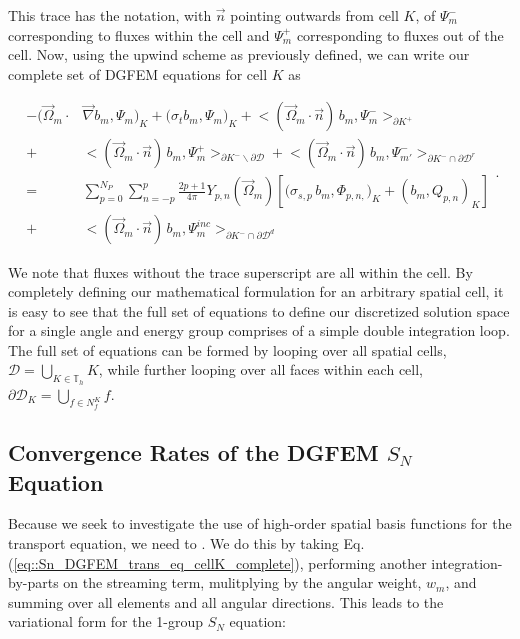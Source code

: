 \noindent This trace has the notation, with $\vec{n}$ pointing outwards from cell $K$, of $\Psi_m^-$ corresponding to fluxes within the cell and $\Psi_m^+$ corresponding to fluxes out of the cell. Now, using the upwind scheme as previously defined, we can write our complete set of DGFEM equations for cell $K$ as

\begin{equation}
\label{eq::Sn_DGFEM_trans_eq_cellK_complete}
\begin{aligned}
-  \Big( \vec{\Omega}_m \cdot  & \vec{\nabla} b_m, \Psi_{m} \Big)_{K}   + \Big(  \sigma_{t} b_m ,   \Psi_{m} \Big)_{K} +  \Big< ( \vec{\Omega}_m \cdot \vec{n} ) \, b_m, {\Psi}_m^{-}  \Big>_{\partial K^+}  \\
  + & \Big< ( \vec{\Omega}_m \cdot \vec{n} ) \, b_m, {\Psi}_m^{+}  \Big>_{\partial K^- \backslash \partial \mathcal{D}}  + \Big< ( \vec{\Omega}_m \cdot \vec{n} ) \, b_m, {\Psi}^{-}_{m'}  \Big>_{\partial K^- \cap \partial \mathcal{D}^r}  \\
= & \sum_{p=0}^{N_P} \sum_{n=-p}^{p} \frac{2p + 1}{4 \pi}  Y_{p,n} (  \vec{\Omega}_m ) \left[ \Big( \sigma_{s,p} \, b_m,  \Phi_{p,n,} \Big)_{K}  + \left(  b_m ,   Q_{p,n} \right)_{K} \right] \\
+ & \Big< ( \vec{\Omega}_m \cdot \vec{n} ) \, b_m, {\Psi}_m^{inc}  \Big>_{\partial K^- \cap \partial \mathcal{D}^d}
\end{aligned} .
\end{equation} 

\noindent We note that fluxes without the trace superscript are all within the cell. By completely defining our mathematical formulation for an arbitrary spatial cell, it is easy to see that the full set of equations to define our discretized solution space for a single angle and energy group comprises of a simple double integration loop. The full set of equations can be formed by looping over all spatial cells, $\mathcal{D} = \bigcup_{K \in \mathbb{T}_h} K$, while further looping over all faces within each cell, $\partial \mathcal{D}_K = \bigcup_{ f \in N_f^K} f$. 

\subsection{Convergence Rates of the DGFEM $S_N$ Equation}
\label{sec::Sn_Spatial_Convergence}

Because we seek to investigate the use of high-order spatial basis functions for the transport equation, we need to . We do this by taking Eq. (\ref{eq::Sn_DGFEM_trans_eq_cellK_complete}), performing another integration-by-parts on the streaming term, mulitplying by the angular weight, $w_m$, and summing over all elements and all angular directions. This leads to the variational form for the 1-group $S_N$ equation:

